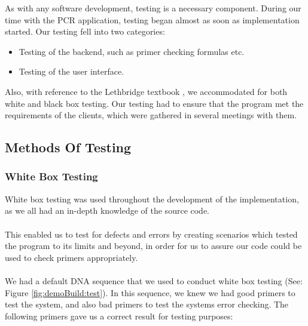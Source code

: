 %
%

As with any software development, testing is a necessary component. During our time with the PCR application, testing began
almost as soon as implementation started. Our testing fell into two categories:

\begin{itemize}
\item Testing of the backend, such as primer checking formulas etc.
\item Testing of the user interface.
\end{itemize}

Also, with reference to the Lethbridge textbook \cite{Lethbridge}, we
accommodated for both white and black box testing. Our testing had to
ensure that the program met the requirements of the clients, which
were gathered in several meetings with them.

\subsection{Methods Of Testing}

\subsubsection{White Box Testing}
White box testing was used throughout the development of the
implementation, as we all had an in-depth knowledge of the source
code. \\ \\
This enabled us to test for defects and errors by creating
scenarios which tested the program to its limits and beyond, in order
for us to assure our code could be used to check primers
appropriately. \\ \\
We had a default DNA sequence that we used to conduct white box
testing (See: Figure \ref{fig:demoBuild:test}).
In this sequence, we knew we had good primers to test the system, and
also bad primers to test the systems error checking. The following primers
gave us a correct result for testing purposes: \\ \\

